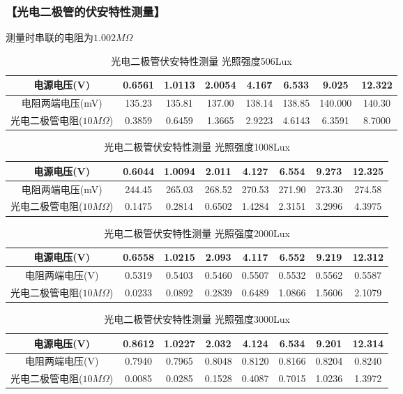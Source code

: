 \documentclass{ctexart}
\let\oldsubsubsection\subsubsection
\renewcommand{\subsubsection}[1]{\oldsubsubsection{\!\!\!\!\!\!【#1】}}
\begin{document}
\subsubsection{光电二极管的伏安特性测量}

测量时串联的电阻为$1.002M\Omega$

\begin{table}[H]
  \centering
  \begin{tabular}{|c|c|c|c|c|c|c|c|}
    \hline
    电源电压(V) &0.6561&1.0113&2.0054&4.167&6.533&9.025&12.322\\\hline
    电阻两端电压(mV) &135.23&135.81&137.00&138.14&138.85&140.000&140.30\\\hline
    光电二极管电阻($10M\Omega$) & 0.3859&0.6459&1.3665&2.9223&4.6143&6.3591&8.7000\\\hline
  \end{tabular}
  \caption{光电二极管伏安特性测量 光照强度506Lux}
\end{table}

\begin{table}[H]
  \centering
  \begin{tabular}{|c|c|c|c|c|c|c|c|}
    \hline
    电源电压(V) &0.6044&1.0094&2.011&4.127&6.554&9.273&12.325\\\hline
    电阻两端电压(mV) &244.45&265.03&268.52&270.53&271.90&273.30&274.58\\\hline
    光电二极管电阻($10M\Omega$) & 0.1475&0.2814&0.6502&1.4284&2.3151&3.2996&4.3975\\\hline
  \end{tabular}
  \caption{光电二极管伏安特性测量 光照强度1008Lux}
\end{table}

\begin{table}[H]
  \centering
  \begin{tabular}{|c|c|c|c|c|c|c|c|}
    \hline
    电源电压(V) &0.6558&1.0215&2.093&4.117&6.552&9.219&12.312\\\hline
    电阻两端电压(V) &0.5319&0.5403&0.5460&0.5507&0.5532&0.5562&0.5587\\\hline
    光电二极管电阻($10M\Omega$) & 0.0233&0.0892&0.2839&0.6489&1.0866&1.5606&2.1079\\\hline
  \end{tabular}
  \caption{光电二极管伏安特性测量 光照强度2000Lux}
\end{table}

\begin{table}[H]
  \centering
  \begin{tabular}{|c|c|c|c|c|c|c|c|}
    \hline
    电源电压(V) &0.8612&1.0227&2.032&4.124&6.534&9.201&12.314\\\hline
    电阻两端电压(V) &0.7940&0.7965&0.8048&0.8120&0.8166&0.8204&0.8240\\\hline
    光电二极管电阻($10M\Omega$) & 0.0085&0.0285&0.1528&0.4087&0.7015&1.0236&1.3972\\\hline
  \end{tabular}
  \caption{光电二极管伏安特性测量 光照强度3000Lux}
\end{table}
\end{document}
